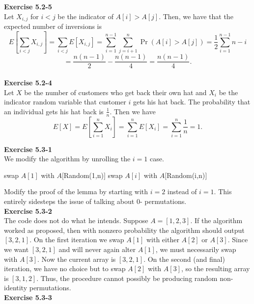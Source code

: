 \documentclass{article}
\begin{document}
\noindent\textbf{Exercise 5.2-5}\\

Let $X_{i,j}$ for $i<j$ be the indicator of $A[i] > A[j]$. Then, we have that the expected number of inversions is
\[
E\left[\sum_{i<j} X_{i,j}\right] = \sum_{i<j} E[X_{i,j}] = \sum_{i=1}^{n-1} \sum_{j=i+1}^n \Pr(A[i] > A[j]) = \frac{1}{2} \sum_{i=1}^{n-1} n-i \]\[= \frac{n(n-1)}{2} - \frac{n(n-1)}{4} = \frac{n(n-1)}{4} . 
\]\\

\noindent\textbf{Exercise 5.2-4}\\

Let $X$ be the number of customers who get back their own hat and $X_i$ be the indicator random variable that customer $i$ gets his hat back.  The probability that an individual gets his hat back is $\frac{1}{n}$.  Then we have
\[ E[X] = E\left[ \sum_{i=1}^n X_i \right] = \sum_{i=1}^n E[X_i] = \sum_{i=1}^n \frac{1}{n} = 1.\]

\noindent\textbf{Exercise 5.3-1}\\

We modify the algorithm by unrolling the $i=1$ case.
\begin{algorithm}
\begin{algorithmic}[1]
\State swap $A[1]$ with $A[$Random(1,n)$]$
\State swap $A[i]$ with $A[$Random(i,n)$]$
\EndFor
\end{algorithmic}
\end{algorithm}


Modify the proof of the lemma by starting with $i=2$ instead of $i=1$. This entirely sidesteps the issue of talking about $0$- permutations.\\

\noindent\textbf{Exercise 5.3-2}\\

The code does not do what he intends.  Suppose $A = [1,2,3]$.  If the algorithm worked as proposed, then with nonzero probability the algorithm should output $[3,2,1]$.  On the first iteration we swap $A[1]$ with either $A[2]$ or $A[3]$.  Since we want $[3,2,1]$ and will never again alter $A[1]$, we must necessarily swap with $A[3]$.  Now the current array is $[3,2,1]$.  On the second (and final) iteration, we have no choice but to swap $A[2]$ with $A[3]$, so the resulting array is $[3,1,2]$.  Thus, the procedure cannot possibly be producing random non-identity permutations. \\

\noindent\textbf{Exercise 5.3-3}\\
\end{document}
